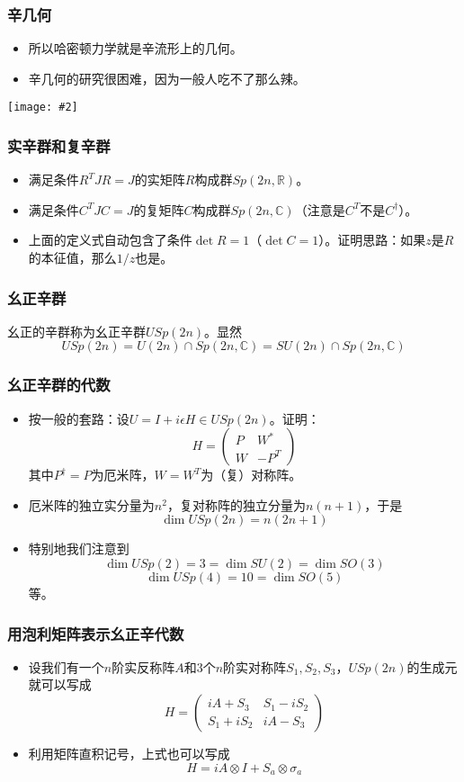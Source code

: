 \documentclass[CJK]{beamer}
\newcommand{\reals}{\mathbb{R}}
\newcommand{\complexs}{\mathbb{C}}
\newcommand{\cpic}[2]{
\begin{center}
\texttt{[image: \#2]}
\end{center}
}
\begin{document}
\begin{frame}
\frametitle{\bch 辛几何 \ech}
\bch

\begin{itemize}
\item 所以哈密顿力学就是辛流形上的几何。
\item 辛几何的研究很困难，因为一般人吃不了那么辣。
\end{itemize}
\cpic{0.25}{hot}
\ech
\end{frame}




\begin{frame}
\frametitle{\bch 实辛群和复辛群 \ech}
\bch
\begin{itemize}
\item 满足条件$R^T J R = J$的实矩阵$R$构成群$Sp(2n,\reals)$。
\item 满足条件$C^T J C = J$的复矩阵$C$构成群$Sp(2n,\complexs)$（注意是$C^T$不是$C^\dagger$）。
\item 上面的定义式自动包含了条件$\det R = 1$（$\det C = 1$）。证明思路：如果$z$是$R$的本征值，那么$1/z$也是。
\end{itemize}
\ech
\end{frame}

\begin{frame}
\frametitle{\bch 幺正辛群 \ech}
\bch
幺正的辛群称为幺正辛群$USp(2n)$。显然
$$
USp(2n) = U(2n) \cap Sp(2n,\complexs) = SU(2n) \cap Sp(2n,\complexs)
$$
\ech
\end{frame}


\begin{frame}
\frametitle{\bch 幺正辛群的代数 \ech}
\bch
\begin{itemize}
\item
按一般的套路：设$U = I + i\epsilon H \in USp(2n)$。证明：
$$
H = \begin{pmatrix} P & W^* \\ W & -P^T\end{pmatrix}
$$
其中$P^\dagger = P$为厄米阵，$W = W^T$为（复）对称阵。
\item
厄米阵的独立实分量为$n^2$，复对称阵的独立分量为$n(n+1)$，于是
$$
\dim USp(2n) = n(2n+1)
$$
\item 特别地我们注意到
$$\dim USp(2) = 3 = \dim SU(2) = \dim SO(3)$$ $$\dim USp(4) = 10 = \dim SO(5)$$等。
\end{itemize}
\ech
\end{frame}

\begin{frame}
\frametitle{\bch 用泡利矩阵表示幺正辛代数 \ech}
\bch
\begin{itemize}
\item
设我们有一个$n$阶实反称阵$A$和3个$n$阶实对称阵$S_1,S_2,S_3$，$USp(2n)$的生成元就可以写成
$$
H = \begin{pmatrix} iA + S_3 & S_1 - iS_2 \\ S_1 + iS_2 & iA - S_3 \end{pmatrix}
$$
\item
利用矩阵直积记号，上式也可以写成
$$
H = iA \otimes I + S_a \otimes \sigma_a
$$
\end{itemize}
\ech
\end{frame}
\end{document}
